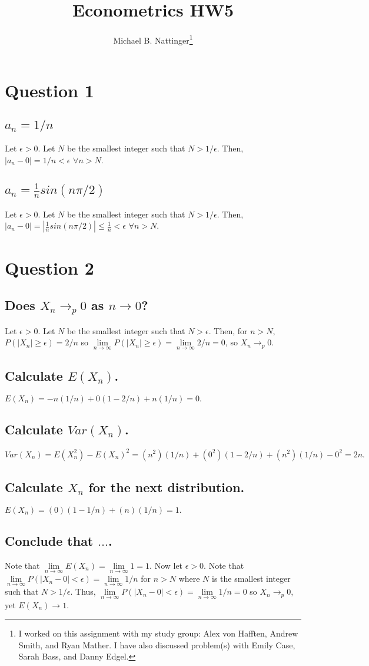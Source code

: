 \documentclass[11pt]{article} %
\title{Econometrics HW5}
\author{Michael B. Nattinger\footnote{I worked on this assignment with my study group: Alex von Hafften, Andrew Smith, and Ryan Mather. I have also discussed problem(s) with Emily Case, Sarah Bass, and Danny Edgel.}}
\begin{document}
\maketitle

\section{Question 1}
\subsection{$a_n = 1/n$}
Let $\epsilon>0$. Let $N$ be the smallest integer such that $N>1/\epsilon.$ Then, $|a_n -0| = 1/n<\epsilon $ $\forall n>N.$
\subsection{$a_n = \frac{1}{n}sin(n\pi/2)$}
Let $\epsilon>0$. Let $N$ be the smallest integer such that $N>1/\epsilon.$ Then, $|a_n -0| = |\frac{1}{n}sin(n\pi/2)|\leq \frac{1}{n}<\epsilon$ $\forall n>N$.

\section{Question 2}
\subsection{Does $X_n\rightarrow_p 0$ as $n \rightarrow 0$?}
Let $\epsilon>0$. Let $N$ be the smallest integer such that $N>\epsilon.$ Then, for $n>N,$ $P(|X_n|\geq \epsilon) = 2/n$  so $\lim\limits_{n\rightarrow \infty}P(|X_n|\geq \epsilon) = \lim\limits_{n\rightarrow \infty} 2/n =  0 $, so $X_n \rightarrow_p 0.$%
\subsection{Calculate $E(X_n)$.}
$E(X_n) = -n(1/n) +0(1-2/n) + n(1/n) = 0.$
\subsection{Calculate $Var(X_n)$.}
$Var(X_n) = E(X_n^2) - E(X_n)^2 = (n^2)(1/n) + (0^2)(1-2/n) + (n^2)(1/n) -0^2 = 2n.$
\subsection{Calculate $X_n$ for the next distribution.}
$E(X_n) = (0)(1-1/n) + (n)(1/n) =1.$
\subsection{Conclude that $\dots$.}
Note that $\lim\limits_{n\rightarrow \infty}E(X_n) = \lim\limits_{n\rightarrow \infty}1 = 1.$ Now let $\epsilon >0$. Note that $\lim\limits_{n\rightarrow \infty}P(|X_n-0|<\epsilon) = \lim\limits_{n\rightarrow \infty}1/n$ for $n>N$ where $N$ is the smallest integer such that $N>1/\epsilon$. Thus, $\lim\limits_{n\rightarrow \infty}P(|X_n-0|<\epsilon) = \lim\limits_{n\rightarrow \infty}1/n = 0$ so $X_n \rightarrow_p 0$, yet $E(X_n) \rightarrow 1.$
\end{document}

